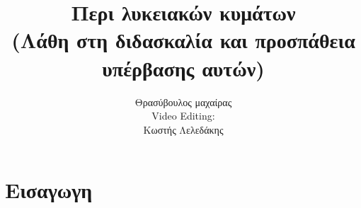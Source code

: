 \documentclass{beamer}
\title{Περι λυκειακών κυμάτων \\ (Λάθη στη διδασκαλία και προσπάθεια υπέρβασης αυτών) }
\author{Θρασύβουλος μαχαίρας\\\foreignlanguage{english}{Video Editing:}
  \\ Κωστής Λελεδάκης}
\begin{document}
\section{Εισαγωγη}
\begin{frame}
  \maketitle
\end{frame}
\end{document}
